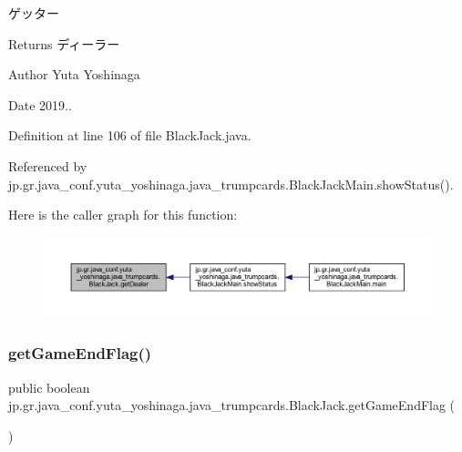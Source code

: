 ゲッター 

\begin{DoxyReturn}{Returns}
ディーラー 
\end{DoxyReturn}
\begin{DoxyAuthor}{Author}
Yuta Yoshinaga 
\end{DoxyAuthor}
\begin{DoxyDate}{Date}
2019.. 
\end{DoxyDate}


Definition at line 106 of file Black\+Jack.\+java.



Referenced by jp.\+gr.\+java\+\_\+conf.\+yuta\+\_\+yoshinaga.\+java\+\_\+trumpcards.\+Black\+Jack\+Main.\+show\+Status().

Here is the caller graph for this function\+:
\nopagebreak
\begin{figure}[H]
\begin{center}
\leavevmode
\includegraphics[width=350pt]{classjp_1_1gr_1_1java__conf_1_1yuta__yoshinaga_1_1java__trumpcards_1_1_black_jack_ae3829512336f2ca3f931924b435c8593_icgraph}
\end{center}
\end{figure}
\mbox{\label{classjp_1_1gr_1_1java__conf_1_1yuta__yoshinaga_1_1java__trumpcards_1_1_black_jack_aa541fa5982861610f084bede8c5d6ac1}} 
\subsubsection{\texorpdfstring{get\+Game\+End\+Flag()}{getGameEndFlag()}}
{\footnotesize\ttfamily public boolean jp.\+gr.\+java\+\_\+conf.\+yuta\+\_\+yoshinaga.\+java\+\_\+trumpcards.\+Black\+Jack.\+get\+Game\+End\+Flag (\begin{DoxyParamCaption}{ }\end{DoxyParamCaption})}



